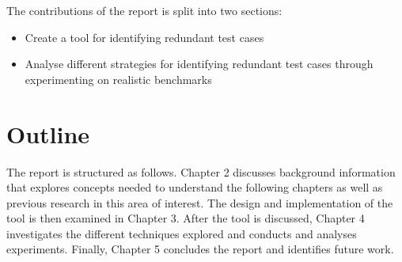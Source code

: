 The contributions of the report is split into two sections: 

\begin{itemize}
\item Create a tool for identifying redundant test cases
\item Analyse different strategies for identifying redundant test cases through experimenting on realistic benchmarks
\end{itemize}

\section{Outline}

The report is structured as follows. Chapter 2 discusses background information that explores concepts needed to understand the following chapters as well as previous research in this area of interest. The design and implementation of the tool is then examined in Chapter 3. After the tool is discussed, Chapter 4 investigates the different techniques explored and conducts and analyses experiments. Finally, Chapter 5 concludes the report and identifies future work.